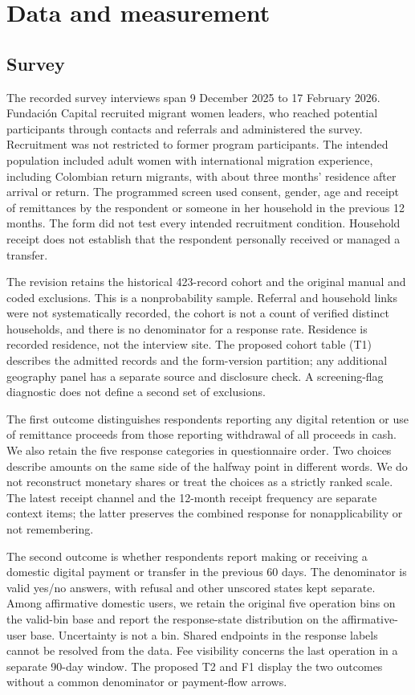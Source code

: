 \section{Data and measurement}
\subsection{Survey}

The recorded survey interviews span 9 December 2025 to 17 February 2026. Fundación Capital recruited migrant women leaders, who reached potential participants through contacts and referrals and administered the survey. Recruitment was not restricted to former program participants. The intended population included adult women with international migration experience, including Colombian return migrants, with about three months' residence after arrival or return. The programmed screen used consent, gender, age and receipt of remittances by the respondent or someone in her household in the previous 12 months. The form did not test every intended recruitment condition. Household receipt does not establish that the respondent personally received or managed a transfer.

The revision retains the historical 423-record cohort and the original manual and coded exclusions. This is a nonprobability sample. Referral and household links were not systematically recorded, the cohort is not a count of verified distinct households, and there is no denominator for a response rate. Residence is recorded residence, not the interview site. The proposed cohort table (T1) describes the admitted records and the form-version partition; any additional geography panel has a separate source and disclosure check. A screening-flag diagnostic does not define a second set of exclusions.

The first outcome distinguishes respondents reporting any digital retention or use of remittance proceeds from those reporting withdrawal of all proceeds in cash. We also retain the five response categories in questionnaire order. Two choices describe amounts on the same side of the halfway point in different words. We do not reconstruct monetary shares or treat the choices as a strictly ranked scale. The latest receipt channel and the 12-month receipt frequency are separate context items; the latter preserves the combined response for nonapplicability or not remembering.

The second outcome is whether respondents report making or receiving a domestic digital payment or transfer in the previous 60 days. The denominator is valid yes/no answers, with refusal and other unscored states kept separate. Among affirmative domestic users, we retain the original five operation bins on the valid-bin base and report the response-state distribution on the affirmative-user base. Uncertainty is not a bin. Shared endpoints in the response labels cannot be resolved from the data. Fee visibility concerns the last operation in a separate 90-day window. The proposed T2 and F1 display the two outcomes without a common denominator or payment-flow arrows.

